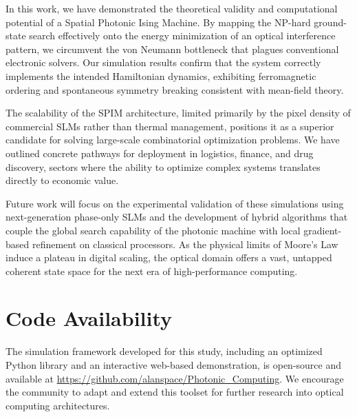 In this work, we have demonstrated the theoretical validity and computational potential of a Spatial Photonic Ising Machine. By mapping the NP-hard ground-state search effectively onto the energy minimization of an optical interference pattern, we circumvent the von Neumann bottleneck that plagues conventional electronic solvers. Our simulation results confirm that the system correctly implements the intended Hamiltonian dynamics, exhibiting ferromagnetic ordering and spontaneous symmetry breaking consistent with mean-field theory.

The scalability of the SPIM architecture, limited primarily by the pixel density of commercial SLMs rather than thermal management, positions it as a superior candidate for solving large-scale combinatorial optimization problems. We have outlined concrete pathways for deployment in logistics, finance, and drug discovery, sectors where the ability to optimize complex systems translates directly to economic value.

Future work will focus on the experimental validation of these simulations using next-generation phase-only SLMs and the development of hybrid algorithms that couple the global search capability of the photonic machine with local gradient-based refinement on classical processors. As the physical limits of Moore's Law induce a plateau in digital scaling, the optical domain offers a vast, untapped coherent state space for the next era of high-performance computing.

\section*{Code Availability}
The simulation framework developed for this study, including an optimized Python library and an interactive web-based demonstration, is open-source and available at \url{https://github.com/alanspace/Photonic_Computing}. We encourage the community to adapt and extend this toolset for further research into optical computing architectures.
